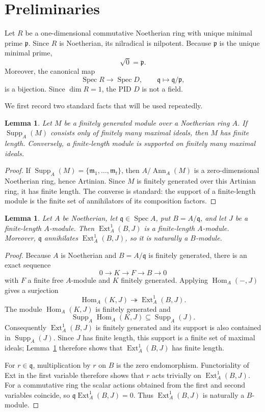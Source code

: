 \documentclass[11pt]{article}
\newtheorem{lemma}[theorem]{Lemma}
\theoremstyle{definition}
\newcommand{\Spec}{\operatorname{Spec}}
\newcommand{\Supp}{\operatorname{Supp}}
\newcommand{\Ann}{\operatorname{Ann}}
\newcommand{\Ext}{\operatorname{Ext}}
\newcommand{\Hom}{\operatorname{Hom}}
\begin{document}
\section{Preliminaries}

 Let $R$ be a one-dimensional commutative Noetherian ring with unique minimal prime
 $\mathfrak p$.  Since $R$ is Noetherian, its nilradical is nilpotent.  Because
$\mathfrak p$ is the unique minimal prime,
\[
 \sqrt{0}=\mathfrak p.
\]
Moreover, the canonical map
\[
 \Spec R\longrightarrow\Spec D,
 \qquad
 \mathfrak q\longmapsto\mathfrak q/\mathfrak p,
\]
is a bijection.  Since $\dim R=1$, the PID $D$ is not a field.

We first record two standard facts that will be used repeatedly.

\begin{lemma}\label{lem:finite-length-support}
Let $M$ be a finitely generated module over a Noetherian ring $A$.  If
$\Supp_A(M)$ consists only of finitely many maximal ideals, then $M$ has finite length.
Conversely, a finite-length module is supported on finitely many maximal ideals.
\end{lemma}

\begin{proof}
If $\Supp_A(M)=\{\mathfrak m_1,\ldots,\mathfrak m_t\}$, then
$A/\Ann_A(M)$ is a zero-dimensional Noetherian ring, hence Artinian.  Since $M$ is finitely
generated over this Artinian ring, it has finite length.  The converse is standard: the support
of a finite-length module is the finite set of annihilators of its composition factors.
\end{proof}

\begin{lemma}\label{lem:ext-finite-length}
Let $A$ be Noetherian, let $\mathfrak q\in\Spec A$, put $B=A/\mathfrak q$, and let $J$ be
a finite-length $A$-module.  Then $\Ext^1_A(B,J)$ is a finite-length $A$-module.  Moreover,
$\mathfrak q$ annihilates $\Ext^1_A(B,J)$, so it is naturally a $B$-module.
\end{lemma}

\begin{proof}
Because $A$ is Noetherian and $B=A/\mathfrak q$ is finitely generated, there is an exact
sequence
\[
 0\longrightarrow K\longrightarrow F\longrightarrow B\longrightarrow0
\]
with $F$ a finite free $A$-module and $K$ finitely generated.  Applying
$\Hom_A(-,J)$ gives a surjection
\[
 \Hom_A(K,J)\twoheadrightarrow \Ext^1_A(B,J).
\]
The module $\Hom_A(K,J)$ is finitely generated and
\[
 \Supp_A\Hom_A(K,J)\subseteq\Supp_A(J).
\]
Consequently $\Ext^1_A(B,J)$ is finitely generated and its support is also contained in
$\Supp_A(J)$.  Since $J$ has finite length, this support is a finite set of maximal ideals;
Lemma~\ref{lem:finite-length-support} therefore shows that $\Ext^1_A(B,J)$ has finite length.

For $r\in\mathfrak q$, multiplication by $r$ on $B$ is the zero endomorphism.  Functoriality
of Ext in the first variable therefore shows that $r$ acts trivially on
$\Ext^1_A(B,J)$.  For a commutative ring the scalar actions obtained from the first and second
variables coincide, so $\mathfrak q\Ext^1_A(B,J)=0$.  Thus $\Ext^1_A(B,J)$ is naturally a
$B$-module.
\end{proof}
\end{document}
